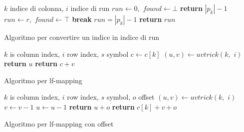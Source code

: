 \begin{algorithm}
  \footnotesize
  \begin{algorithmic}[1]
    \Comment $k$ indice di colonna, $i$ indice di run
    \State $run\gets 0,\,\,found\gets \bot$
    \State \textbf{return} $|p_k|-1$
    \EndIf
    \State $run\gets r,\,\,found \gets \top$
    \State \textbf{break}
    \EndIf
    \EndFor
    \State $run=|p_k|-1$
    \EndIf
    \State \textbf{return} $run$
    \EndFunction
  \end{algorithmic}
  \caption{Algoritmo per convertire un indice in indice di run}
  \label{algo:itr}
\end{algorithm}

\begin{algorithm}
  \begin{algorithmic}[1]
    \Comment $k$ is column index, $i$ row index, $s$ symbol
    \State $c\gets c[k]$
    \State $(u, v) \gets uvtrick(k,\,\,i)$
    \State \textbf{return} $u$
    \Else
    \State \textbf{return} $c+v$
    \EndIf
    \EndFunction
  \end{algorithmic}
  \label{algo:lfr}
  \caption{Algoritmo per lf-mapping}
\end{algorithm}

\begin{algorithm}
  \begin{algorithmic}[1]
    \Comment $k$ is column index, $i$ row index, $s$ symbol, $o$ offset
    \State $(u,v)\gets uvtrick(k,\,\,i)$
    \State $v\gets v-1$
    \Else
    \State $u\gets u-1$
    \EndIf
    \EndIf
    \State \textbf{return} $u+o$
    \Else
    \State \textbf{return} $c[k]+v+o$
    \EndIf
    \EndFunction
  \end{algorithmic}
  \label{algo:lfro}
  \caption{Algoritmo per lf-mapping con offset}
\end{algorithm}

